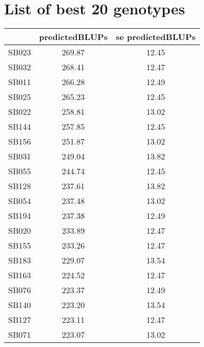 \documentclass[a4paper,11pt]{article}\usepackage[]{graphicx}\usepackage[]{color}
\begin{document}
\section{List of best 20 genotypes}
\begin{table}[ht]
\begin{flushleft}
\begin{tabular}{lcc}
  \hline
 & predictedBLUPs & se predictedBLUPs \\ 
  \hline
SB023 & 269.87 & 12.45 \\ 
  SB032 & 268.41 & 12.47 \\ 
  SB011 & 266.28 & 12.49 \\ 
  SB025 & 265.23 & 12.45 \\ 
  SB022 & 258.81 & 13.02 \\ 
  SB144 & 257.85 & 12.45 \\ 
  SB156 & 251.87 & 13.02 \\ 
  SB031 & 249.04 & 13.82 \\ 
  SB055 & 244.74 & 12.45 \\ 
  SB128 & 237.61 & 13.82 \\ 
  SB054 & 237.48 & 13.02 \\ 
  SB194 & 237.38 & 12.49 \\ 
  SB020 & 233.89 & 12.47 \\ 
  SB155 & 233.26 & 12.47 \\ 
  SB183 & 229.07 & 13.54 \\ 
  SB163 & 224.52 & 12.47 \\ 
  SB076 & 223.37 & 12.49 \\ 
  SB140 & 223.20 & 13.54 \\ 
  SB127 & 223.11 & 12.47 \\ 
  SB071 & 223.07 & 13.02 \\ 
   \hline
\end{tabular}
\label{bestTab}
\end{flushleft}
\end{table}

\end{document}
